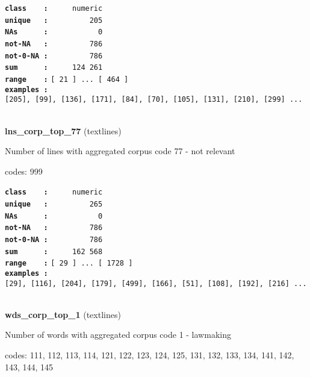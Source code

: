 \documentclass[]{article}
\begin{document}
\textbf{\texttt{class\ \ \ \ :}} \texttt{~~~~~numeric}\\
\textbf{\texttt{unique\ \ \ :}} \texttt{~~~~~~~~~205}\\
\textbf{\texttt{NAs\ \ \ \ \ \ :}} \texttt{~~~~~~~~~~~0}\\
\textbf{\texttt{not-NA\ \ \ :}} \texttt{~~~~~~~~~786}\\
\textbf{\texttt{not-0-NA\ :}} \texttt{~~~~~~~~~786}\\
\textbf{\texttt{sum\ \ \ \ \ \ :}} \texttt{~~~~~124~261}\\
\textbf{\texttt{range\ \ \ \ :}}
\texttt{{[}\ 21\ {]}\ ...\ {[}\ 464\ {]}}\\
\textbf{\texttt{examples\ :}}
\texttt{{[}205{]},\ {[}99{]},\ {[}136{]},\ {[}171{]},\ {[}84{]},\ {[}70{]},\ {[}105{]},\ {[}131{]},\ {[}210{]},\ {[}299{]}\ ...}\\

~

\textbf{lns\_corp\_top\_77} (textlines)

Number of lines with aggregated corpus code 77 - not relevant

codes: 999

\textbf{\texttt{class\ \ \ \ :}} \texttt{~~~~~numeric}\\
\textbf{\texttt{unique\ \ \ :}} \texttt{~~~~~~~~~265}\\
\textbf{\texttt{NAs\ \ \ \ \ \ :}} \texttt{~~~~~~~~~~~0}\\
\textbf{\texttt{not-NA\ \ \ :}} \texttt{~~~~~~~~~786}\\
\textbf{\texttt{not-0-NA\ :}} \texttt{~~~~~~~~~786}\\
\textbf{\texttt{sum\ \ \ \ \ \ :}} \texttt{~~~~~162~568}\\
\textbf{\texttt{range\ \ \ \ :}}
\texttt{{[}\ 29\ {]}\ ...\ {[}\ 1728\ {]}}\\
\textbf{\texttt{examples\ :}}
\texttt{{[}29{]},\ {[}116{]},\ {[}204{]},\ {[}179{]},\ {[}499{]},\ {[}166{]},\ {[}51{]},\ {[}108{]},\ {[}192{]},\ {[}216{]}\ ...}\\

~

\textbf{wds\_corp\_top\_1} (textlines)

Number of words with aggregated corpus code 1 - lawmaking

codes: 111, 112, 113, 114, 121, 122, 123, 124, 125, 131, 132, 133, 134,
141, 142, 143, 144, 145
\end{document}
